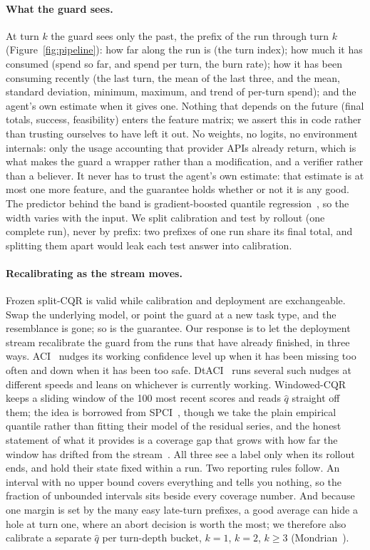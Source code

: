 \documentclass{article}
\begin{document}
\paragraph{What the guard sees.}
At turn $k$ the guard sees only the past, the prefix of the run through turn $k$ (Figure~\ref{fig:pipeline}): how far along the run is (the turn index); how much it has consumed (spend so far, and spend per turn, the burn rate); how it has been consuming recently (the last turn, the mean of the last three, and the mean, standard deviation, minimum, maximum, and trend of per-turn spend); and the agent's own estimate when it gives one. Nothing that depends on the future (final totals, success, feasibility) enters the feature matrix; we assert this in code rather than trusting ourselves to have left it out. No weights, no logits, no environment internals: only the usage accounting that provider APIs already return, which is what makes the guard a wrapper rather than a modification, and a verifier rather than a believer. It never has to trust the agent's own estimate: that estimate is at most one more feature, and the guarantee holds whether or not it is any good. The predictor behind the band is gradient-boosted quantile regression~\cite{ke2017lightgbm}, so the width varies with the input. We split calibration and test by rollout (one complete run), never by prefix: two prefixes of one run share its final total, and splitting them apart would leak each test answer into calibration.

\paragraph{Recalibrating as the stream moves.}
Frozen split-CQR is valid while calibration and deployment are exchangeable. Swap the underlying model, or point the guard at a new task type, and the resemblance is gone; so is the guarantee. Our response is to let the deployment stream recalibrate the guard from the runs that have already finished, in three ways. ACI~\cite{gibbs2021aci} nudges its working confidence level up when it has been missing too often and down when it has been too safe. DtACI~\cite{gibbs2024dtaci} runs several such nudges at different speeds and leans on whichever is currently working. Windowed-CQR keeps a sliding window of the 100 most recent scores and reads $\hat q$ straight off them; the idea is borrowed from SPCI~\cite{xu2023spci}, though we take the plain empirical quantile rather than fitting their model of the residual series, and the honest statement of what it provides is a coverage gap that grows with how far the window has drifted from the stream~\cite{barber2023beyond}. All three see a label only when its rollout ends, and hold their state fixed within a run. Two reporting rules follow. An interval with no upper bound covers everything and tells you nothing, so the fraction of unbounded intervals sits beside every coverage number. And because one margin is set by the many easy late-turn prefixes, a good average can hide a hole at turn one, where an abort decision is worth the most; we therefore also calibrate a separate $\hat q$ per turn-depth bucket, $k{=}1$, $k{=}2$, $k{\ge}3$ (Mondrian~\cite{vovk2012conditional}).
\end{document}
